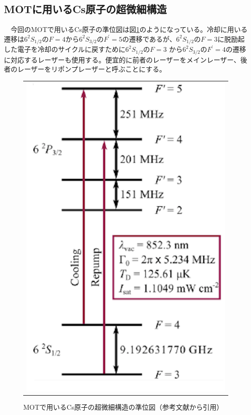 \documentclass[uplatex, dvipdfmx, a4paper, report, papersize, 11pt]{jsbook}
\begin{document}
\subsection{MOTに用いるCs原子の超微細構造}
　今回のMOTで用いるCs原子の準位図は図\ref{Cs_level_diagram_MOT}のようになっている。冷却に用いる遷移は$6 ^ { 2 } S _ { 1 / 2 }$の$F = 4$から$6 ^ { 2 } S _ { 3 / 2 }$の$F ^ { \prime } = 5$の遷移であるが、$6 ^ { 2 } S _ { 1 / 2 }$の$F = 3$に脱励起した電子を冷却のサイクルに戻すために$6 ^ { 2 } S _ { 1 / 2 }$の$F = 3$
から$6 ^ { 2 } S _ { 3 / 2 }$の$F ^ { \prime } = 4$の遷移に対応するレーザーも使用する。便宜的に前者のレーザーをメインレーザー、後者のレーザーをリポンプレーザーと呼ぶことにする。


\begin{figure}[htpb]
  \centering
    \begin{tabular}{c}
      \begin{minipage}{1\hsize}
        \centering
          \includegraphics[keepaspectratio,  scale=0.35,  angle=0]
                          {figures/saturated-absorption/Cs_level_diagram_MOT.png}
                          \caption{MOTで用いるCs原子の超微細構造の準位図（参考文献\cite{Cs_level_diagram}から引用）}
                          \label{Cs_level_diagram_MOT}
      \end{minipage}
    \end{tabular}
\end{figure}
\end{document}
